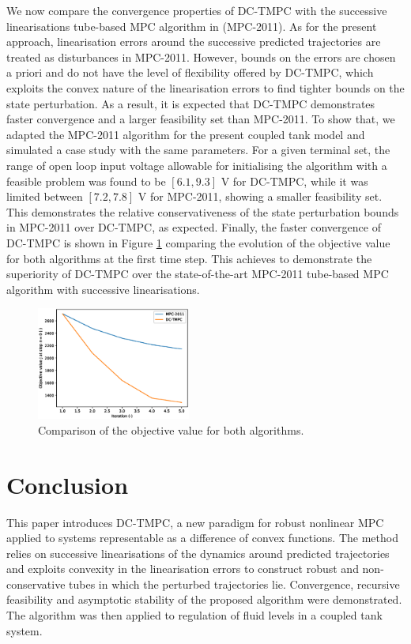 \documentclass[letterpaper, 10 pt, conference]{ieeeconf}
\begin{document}
We now compare the convergence properties of DC-TMPC with the successive linearisations tube-based MPC algorithm in \cite{mark} (MPC-2011). As for the present approach, linearisation errors around the successive predicted trajectories are treated as disturbances in MPC-2011. However, bounds on the errors are chosen a priori and do not have the level of flexibility offered by DC-TMPC, which exploits the convex nature of the linearisation errors to find tighter bounds on the state perturbation. As a result, it is expected that DC-TMPC demonstrates faster convergence and a larger feasibility set than MPC-2011. To show that, we adapted the MPC-2011 algorithm for the present coupled tank model and simulated a case study with the same parameters. 
For a given terminal set, the range of open loop input voltage allowable for initialising the algorithm with a feasible problem was found to be $[6.1, 9.3]$ V for DC-TMPC, while it was limited between $[7.2, 7.8]$ V for MPC-2011, showing a smaller feasibility set. This demonstrates the relative conservativeness of the state perturbation bounds in MPC-2011 over DC-TMPC, as expected. Finally, the faster convergence of DC-TMPC is shown in Figure \ref{fig:tmpc5} comparing the evolution of the objective value for both algorithms at the first time step. This achieves to demonstrate the superiority of DC-TMPC over the state-of-the-art MPC-2011 tube-based MPC algorithm with successive linearisations.  

\begin{figure}[h]
    \centering
    \includegraphics[width=0.45\textwidth]{img/tmpc5.eps} %
    \caption{Comparison of the objective value for both algorithms.}
    \label{fig:tmpc5}
\end{figure}

\section{Conclusion}
\label{sec:conclusion}

This paper introduces DC-TMPC, a new paradigm for robust nonlinear MPC applied to systems representable as a difference of convex functions. The method relies on successive linearisations of the dynamics around predicted trajectories and exploits convexity in the linearisation errors to construct robust and non-conservative tubes in which the perturbed trajectories lie. Convergence, recursive feasibility and asymptotic stability of the proposed algorithm were demonstrated. The algorithm was then applied to regulation of fluid levels in a coupled tank system. 
\end{document}
